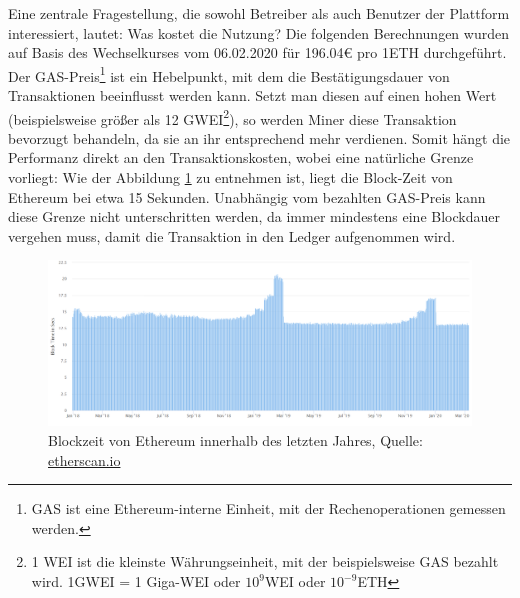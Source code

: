 Eine zentrale Fragestellung, die sowohl Betreiber als auch Benutzer der Plattform interessiert, lautet: Was kostet die Nutzung? Die folgenden Berechnungen wurden auf Basis des Wechselkurses vom 06.02.2020 für 196.04€ pro 1ETH durchgeführt.\\
Der GAS-Preis\footnote{GAS ist eine Ethereum-interne Einheit, mit der Rechenoperationen gemessen werden.} ist ein Hebelpunkt, mit dem die Bestätigungsdauer von Transaktionen beeinflusst werden kann. Setzt man diesen auf einen hohen Wert (beispielsweise größer als 12 GWEI\footnote{1 WEI ist die kleinste Währungseinheit, mit der beispielsweise GAS bezahlt wird. 1GWEI = 1 Giga-WEI oder $ 10^{9} $WEI oder $ 10^{-9} $ETH}), so werden Miner diese Transaktion bevorzugt behandeln, da sie an ihr entsprechend mehr verdienen. Somit hängt die Performanz direkt an den Transaktionskosten, wobei eine natürliche Grenze vorliegt: Wie der Abbildung \ref{fig:chapter07:blocktime} zu entnehmen ist, liegt die Block-Zeit von Ethereum bei etwa 15 Sekunden. Unabhängig vom bezahlten GAS-Preis kann diese Grenze nicht unterschritten werden, da immer mindestens eine Blockdauer vergehen muss, damit die Transaktion in den Ledger aufgenommen wird.

\begin{figure}[h]
 \centering
 \includegraphics[width=1.0\textwidth]{gfx/screenshots/blocktime_ETH.PNG}
 \caption[Blockzeit von Ethereum innerhalb des letzten Jahres]{Blockzeit von Ethereum innerhalb des letzten Jahres, Quelle: \url{etherscan.io}}
 \label{fig:chapter07:blocktime}
\end{figure}

